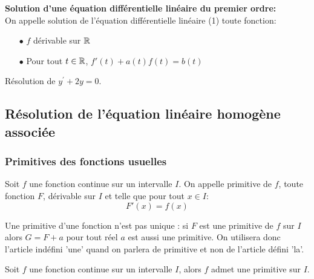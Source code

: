 \documentclass[a4paper, 11pt]{article}
\begin{document}
 {\noindent  

\begin{defi}  \textbf{Solution d'une \'equation diff\'erentielle lin\'eaire du premier ordre:}\\
\noindent On appelle solution de l'\'equation diff\'erentielle lin\'eaire (1) toute fonction: \vsec
\begin{itemize}
\item[$\bullet$] $f$ dérivable sur $\mathbb{R}$ \vsec
\item[$\bullet$] Pour tout $t\in\mathbb{R}$,  $f'(t) +a(t)f(t)=b(t)$\vsec 
\end{itemize}
\end{defi}
 
}



{\footnotesize \begin{exercice} 
R\'esolution de $y^{\prime}+2y=0$.
\end{exercice}
}



\subsection{R\'esolution de l'\'equation lin\'eaire homog\`ene associ\'ee}
\subsubsection{Primitives des fonctions usuelles}
\begin{defi}
Soit $f$ une fonction continue sur un intervalle $I$. On appelle primitive de $f$, toute  fonction $F$, dérivable sur $I$ et telle que pour tout $x\in I$:
$$F'(x) =f(x) $$ 
\end{defi}

\begin{remarques}
\item Une primitive d'une fonction n'est pas unique : si $F$ est une primitive de $f$ sur $I$ alors $G = F+a$ pour tout réel $a$ est aussi une primitive. On utilisera donc l'article indéfini 'une' quand on parlera de primitive et non de l'article défini 'la'.
\end{remarques}

\begin{theorem}
Soit $f$ une fonction continue sur un intervalle $I$, alors $f$ admet une primitive sur $I$. 
\end{theorem}
\end{document}
